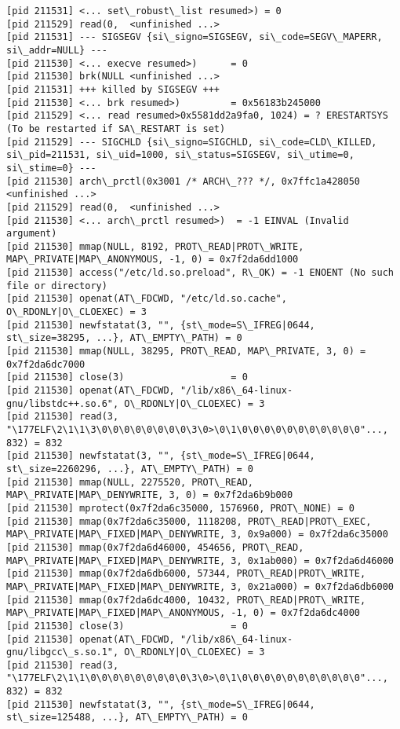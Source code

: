 \documentclass[a4paper, 12pt]{article}
\begin{document}
\begin{lstlisting}
[pid 211531] <... set\_robust\_list resumed>) = 0
[pid 211529] read(0,  <unfinished ...>
[pid 211531] --- SIGSEGV {si\_signo=SIGSEGV, si\_code=SEGV\_MAPERR, si\_addr=NULL} ---
[pid 211530] <... execve resumed>)      = 0
[pid 211530] brk(NULL <unfinished ...>
[pid 211531] +++ killed by SIGSEGV +++
[pid 211530] <... brk resumed>)         = 0x56183b245000
[pid 211529] <... read resumed>0x5581dd2a9fa0, 1024) = ? ERESTARTSYS (To be restarted if SA\_RESTART is set)
[pid 211529] --- SIGCHLD {si\_signo=SIGCHLD, si\_code=CLD\_KILLED, si\_pid=211531, si\_uid=1000, si\_status=SIGSEGV, si\_utime=0, si\_stime=0} ---
[pid 211530] arch\_prctl(0x3001 /* ARCH\_??? */, 0x7ffc1a428050 <unfinished ...>
[pid 211529] read(0,  <unfinished ...>
[pid 211530] <... arch\_prctl resumed>)  = -1 EINVAL (Invalid argument)
[pid 211530] mmap(NULL, 8192, PROT\_READ|PROT\_WRITE, MAP\_PRIVATE|MAP\_ANONYMOUS, -1, 0) = 0x7f2da6dd1000
[pid 211530] access("/etc/ld.so.preload", R\_OK) = -1 ENOENT (No such file or directory)
[pid 211530] openat(AT\_FDCWD, "/etc/ld.so.cache", O\_RDONLY|O\_CLOEXEC) = 3
[pid 211530] newfstatat(3, "", {st\_mode=S\_IFREG|0644, st\_size=38295, ...}, AT\_EMPTY\_PATH) = 0
[pid 211530] mmap(NULL, 38295, PROT\_READ, MAP\_PRIVATE, 3, 0) = 0x7f2da6dc7000
[pid 211530] close(3)                   = 0
[pid 211530] openat(AT\_FDCWD, "/lib/x86\_64-linux-gnu/libstdc++.so.6", O\_RDONLY|O\_CLOEXEC) = 3
[pid 211530] read(3, "\177ELF\2\1\1\3\0\0\0\0\0\0\0\0\3\0>\0\1\0\0\0\0\0\0\0\0\0\0\0"..., 832) = 832
[pid 211530] newfstatat(3, "", {st\_mode=S\_IFREG|0644, st\_size=2260296, ...}, AT\_EMPTY\_PATH) = 0
[pid 211530] mmap(NULL, 2275520, PROT\_READ, MAP\_PRIVATE|MAP\_DENYWRITE, 3, 0) = 0x7f2da6b9b000
[pid 211530] mprotect(0x7f2da6c35000, 1576960, PROT\_NONE) = 0
[pid 211530] mmap(0x7f2da6c35000, 1118208, PROT\_READ|PROT\_EXEC, MAP\_PRIVATE|MAP\_FIXED|MAP\_DENYWRITE, 3, 0x9a000) = 0x7f2da6c35000
[pid 211530] mmap(0x7f2da6d46000, 454656, PROT\_READ, MAP\_PRIVATE|MAP\_FIXED|MAP\_DENYWRITE, 3, 0x1ab000) = 0x7f2da6d46000
[pid 211530] mmap(0x7f2da6db6000, 57344, PROT\_READ|PROT\_WRITE, MAP\_PRIVATE|MAP\_FIXED|MAP\_DENYWRITE, 3, 0x21a000) = 0x7f2da6db6000
[pid 211530] mmap(0x7f2da6dc4000, 10432, PROT\_READ|PROT\_WRITE, MAP\_PRIVATE|MAP\_FIXED|MAP\_ANONYMOUS, -1, 0) = 0x7f2da6dc4000
[pid 211530] close(3)                   = 0
[pid 211530] openat(AT\_FDCWD, "/lib/x86\_64-linux-gnu/libgcc\_s.so.1", O\_RDONLY|O\_CLOEXEC) = 3
[pid 211530] read(3, "\177ELF\2\1\1\0\0\0\0\0\0\0\0\0\3\0>\0\1\0\0\0\0\0\0\0\0\0\0\0"..., 832) = 832
[pid 211530] newfstatat(3, "", {st\_mode=S\_IFREG|0644, st\_size=125488, ...}, AT\_EMPTY\_PATH) = 0

\end{lstlisting}
\end{document}
